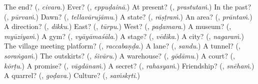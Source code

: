 \begin{tcolorbox}[breakable,colback=teal!4,colframe=teal!35!black,title={Before you move on}]
The end? (\textbf{}, \emph{civara}.) Ever? (\textbf{}, \emph{eppuḍainā}.) At present? (\textbf{}, \emph{prastutaṁ}.) In the past? (\textbf{}, \emph{pūrvaṁ}.) Dawn? (\textbf{}, \emph{tellavārujāmu}.) A state? (\textbf{}, \emph{rāṣṭraṁ}.) An area? (\textbf{}, \emph{prāntaṁ}.) A direction? (\textbf{}, \emph{dikku}.) East? (\textbf{}, \emph{tūrpu}.) West? (\textbf{}, \emph{paḍamara}.) A museum? (\textbf{}, \emph{myūziyaṁ}.) A gym? (\textbf{}, \emph{vyāyāmaśāla}.) A stage? (\textbf{}, \emph{vēdika}.) A city? (\textbf{}, \emph{nagaraṁ}.) The village meeting platform? (\textbf{}, \emph{raccabaṇḍa}.) A lane? (\textbf{}, \emph{sandu}.) A tunnel? (\textbf{}, \emph{soraṅgaṁ}.) The outskirts? (\textbf{}, \emph{śivāru}.) A warehouse? (\textbf{}, \emph{gōdāmu}.) A court? (\textbf{}, \emph{kōrṭu}.) A promise? (\textbf{}, \emph{vāgdānaṁ}.) A secret? (\textbf{}, \emph{rahasyaṁ}.) Friendship? (\textbf{}, \emph{snēhaṁ}.) A quarrel? (\textbf{}, \emph{goḍava}.) Culture? (\textbf{}, \emph{saṁskṛti}.)
\end{tcolorbox}

